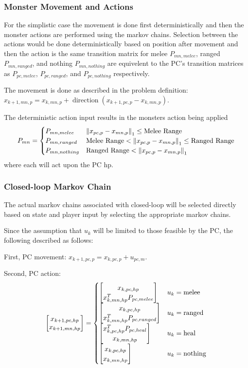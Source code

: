 \documentclass[9pt, onecolumn]{report}
\begin{document}
\subsubsection{Monster Movement and Actions}
For the simplistic case the movement is done first deterministically and then the monster actions are performed using the markov chains.
Selection between the actions would be done deterministically based on position after movement and then the action is the same transition matrix for melee $P_{mn,melee}$, ranged $P_{mn,ranged}$, and nothing $P_{mn,nothing}$ are equivelent to the PC's transition matrices as $P_{pc,melee}$, $P_{pc,ranged}$, and $P_{pc,nothing}$ respectively.

The movement is done as described in the problem definition: $x_{k+1,mn,p} = x_{k,mn,p} + \operatorname{direction}(x_{k+1,pc,p} - x_{k,mn,p})$.

The deterministic action input results in the monsters action being applied \[
    P_{mn} = \begin{cases}
        P_{mn,melee} & \norm{x_{pc,p} - x_{mn,p}}_1 \leq \text{Melee Range}\\
        P_{mn,ranged} & \text{Melee Range} < \norm{x_{pc,p} - x_{mn,p}}_1 \leq \text{Ranged Range}\\
        P_{mn,nothing} & \text{Ranged Range} < \norm{x_{pc,p} - x_{mn,p}}_1
    \end{cases}
\] where each will act upon the PC hp.

\subsubsection{Closed-loop Markov Chain}
The actual markov chains associated with closed-loop will be selected directly based on state and player input by selecting the appropriate markov chains.

Since the assumption that $u_k$ will be limited to those feasible by the PC, the following described as follows:

First, PC movement: $x_{k+1,pc,p} = x_{k,pc,p} + u_{pc,m}$.

Second, PC action: \[
    \mqty[x_{k+1,pc,hp}\\ x_{k+1,mn,hp}] = \begin{cases}
        \mqty[x_{k,pc,hp}\\x_{k,mn,hp}^T P_{pc,melee}] & u_k = \text{melee}\\
        \mqty[x_{k,pc,hp}\\x_{k,mn,hp}^T P_{pc,ranged}] & u_k = \text{ranged}\\
        \mqty[x_{k,pc,hp}^T P_{pc,heal}\\ x_{k,mn,hp}] & u_k = \text{heal}\\
        \mqty[x_{k,pc,hp}\\x_{k,mn,hp}] & u_k = \text{nothing}
    \end{cases}
\]
\end{document}

